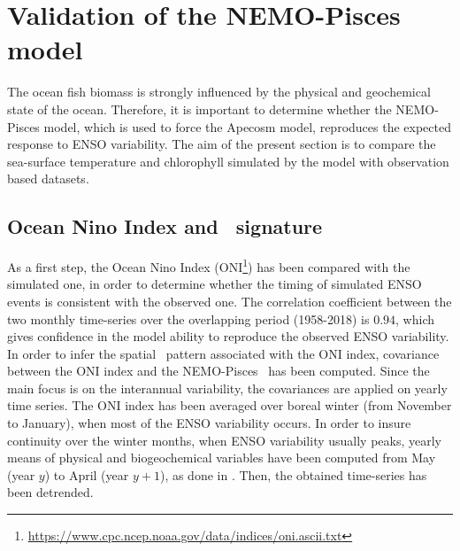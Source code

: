 \section{Validation of the NEMO-Pisces model}
\label{sec:pisces}

The ocean fish biomass is strongly influenced by the physical and geochemical state of the ocean. 
Therefore, it is important to determine whether the NEMO-Pisces model, which is used to force the Apecosm model, reproduces the expected response to ENSO variability.
The aim of the present section is to compare the sea-surface temperature and chlorophyll simulated by the model with observation based datasets.\\

\subsection{Ocean Nino Index and \sst\ signature}
\label{sec:sst}

As a first step, the Ocean Nino Index (ONI\footnote{\url{https://www.cpc.ncep.noaa.gov/data/indices/oni.ascii.txt}}) has been compared with the simulated one, in order to determine whether the timing of simulated ENSO events is consistent with the observed one. The correlation coefficient between the two monthly time-series over the overlapping period (1958-2018) is $0.94$, which gives confidence in the model ability to reproduce the observed ENSO variability. \\

In order to infer the spatial \sst\ pattern associated with the ONI index, covariance between the ONI index and the NEMO-Pisces \sst\ has been computed. Since the main focus is on the interannual variability, the covariances are applied on yearly time series. The ONI index has been averaged over boreal winter (from November to January), when most of the ENSO variability occurs. In order to insure continuity over the winter months, when ENSO variability usually peaks, yearly means of physical and biogeochemical variables have been computed from May (year $y$) to April (year $y + 1$), as done in \cite{racaultImpactNinoVariability2017}. Then, the obtained time-series has been detrended.\\

